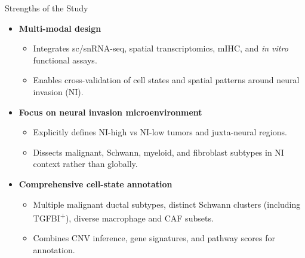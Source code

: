 \documentclass[10pt]{beamer}
\theoremstyle{plain}
\begin{document}
\begin{frame}{Strengths of the Study}
  \begin{itemize}
    \item \textbf{Multi-modal design}
      \begin{itemize}
        \item Integrates sc/snRNA-seq, spatial transcriptomics, mIHC, and \textit{in vitro} functional assays.
        \item Enables cross-validation of cell states and spatial patterns around neural invasion (NI).
      \end{itemize}
    \item \textbf{Focus on neural invasion microenvironment}
      \begin{itemize}
        \item Explicitly defines NI-high vs NI-low tumors and juxta-neural regions.
        \item Dissects malignant, Schwann, myeloid, and fibroblast subtypes in NI context rather than globally.
      \end{itemize}
    \item \textbf{Comprehensive cell-state annotation}
      \begin{itemize}
        \item Multiple malignant ductal subtypes, distinct Schwann clusters (including TGFBI\textsuperscript{+}), diverse macrophage and CAF subsets.
        \item Combines CNV inference, gene signatures, and pathway scores for annotation.
      \end{itemize}
  \end{itemize}
\end{frame}
\end{document}
